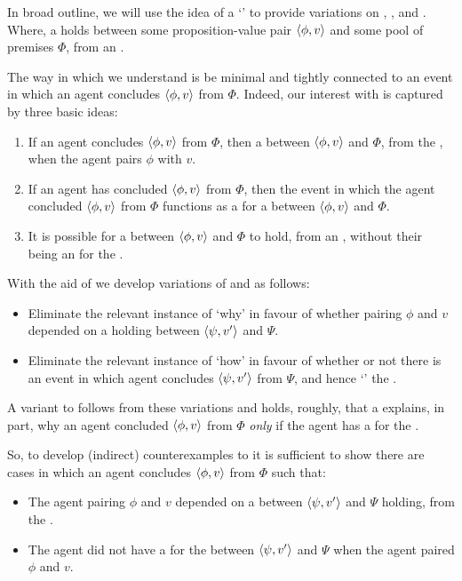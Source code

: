 \begin{note}
  In broad outline, we will use the idea of a `' to provide variations on \qWhy{}, \qHow{}, and \issueInclusion{}.
  Where, a  holds between some proposition-value pair \(\langle \phi, v \rangle\) and some pool of premises \(\Phi\), from an .

  The way in which we understand  is be minimal and tightly connected to an event in which an agent concludes \(\langle \phi, v \rangle\) from \(\Phi\).
  Indeed, our interest with  is captured by three basic ideas:
  \begin{enumerate}
  \item
    If an agent concludes \(\langle \phi, v \rangle\) from \(\Phi\), then a  between \(\langle \phi, v \rangle\) and \(\Phi\), from the \agpe{}, when the agent pairs \(\phi\) with \(v\).
  \item
    If an agent has concluded \(\langle \phi, v \rangle\) from \(\Phi\), then the event in which the agent concluded \(\langle \phi, v \rangle\) from \(\Phi\) functions as a  for a  between \(\langle \phi, v \rangle\) and \(\Phi\).
  \item
    It is possible for a  between \(\langle \phi, v \rangle\) and \(\Phi\) to hold, from an \agpe{}, without their being an  for the .
  \end{enumerate}

  With the aid of  we develop variations of \qWhy{} and \qHow{} as follows:

  \begin{itemize}
  \item
    Eliminate the relevant instance of `why' in favour of whether pairing \(\phi\) and \(v\) depended on a  holding between \(\langle \psi, v' \rangle\) and \(\Psi\).
  \item
    Eliminate the relevant instance of `how' in favour of whether or not there is an event in which agent concludes \(\langle \psi, v' \rangle\) from \(\Psi\), and hence `' the \ros{}.
  \end{itemize}

  A variant to \issueConstraint{} follows from these variations and holds, roughly, that a \ros{} explains, in part, why an agent concluded \(\langle \phi, v \rangle\) from \(\Phi\) \emph{only} if the agent has a \wit{} for the .

  So, to develop (indirect) counterexamples to \issueConstraint{} it is sufficient to show there are cases in which an agent concludes \(\langle \phi, v \rangle\) from \(\Phi\) such that:
  \begin{itemize}
  \item
    The agent pairing \(\phi\) and \(v\) depended on a  between \(\langle \psi, v' \rangle\) and \(\Psi\) holding, from the \agpe{}.
  \item
    The agent did not have a  for the  between \(\langle \psi, v' \rangle\) and \(\Psi\) when the agent paired \(\phi\) and \(v\).
  \end{itemize}
\end{note}

